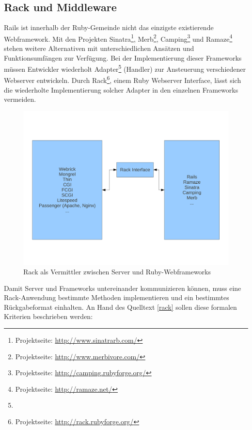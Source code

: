 \subsection{Rack und Middleware}
\label{grundrack}
Rails ist innerhalb der Ruby-Gemeinde nicht das einzigste existierende Webframework. Mit den Projekten Sinatra\footnote{Projektseite: \href{http://www.sinatrarb.com/}{http://www.sinatrarb.com/}}, Merb\footnote{Projektseite: \href{http://www.merbivore.com/}{http://www.merbivore.com/}}, Camping\footnote{Projektseite: \href{http://camping.rubyforge.org/}{http://camping.rubyforge.org/}} und Ramaze\footnote{Projektseite: \href{http://ramaze.net/}{http://ramaze.net/}} stehen weitere Alternativen mit unterschiedlichen Ansätzen und Funktionsumfängen zur Verfügung.
Bei der Implementierung dieser Frameworks müssen Entwickler wiederholt Adapter\footnote{} (Handler) zur Ansteuerung verschiedener Webserver entwickeln. Durch Rack\footnote{Projektseite: \href{http://rack.rubyforge.org/}{http://rack.rubyforge.org/}}, einem Ruby Webserver Interface, lässt sich die wiederholte Implementierung solcher Adapter in den einzelnen Frameworks vermeiden.
\begin{figure}[!h]
\begin{center}
\includegraphics[scale=0.47]{images/rack/rack.pdf}
\caption{Rack als Vermittler zwischen Server und Ruby-Webframeworks}
\label{rackschema}
\end{center}
\end{figure}


Damit Server und Frameworks untereinander kommunizieren können, muss eine Rack-Anwendung bestimmte Methoden implementieren und ein bestimmtes Rückgabeformat einhalten. An Hand des Quelltext \ref{rack} sollen diese formalen Kriterien beschrieben werden:

